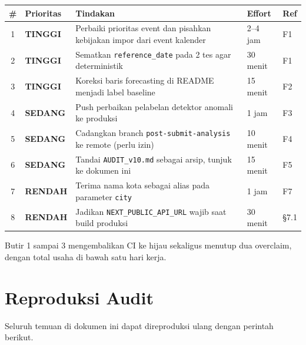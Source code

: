 \documentclass[11pt,a4paper]{article}
\newcommand{\code}[1]{\texttt{\small #1}}
\newcommand{\sevH}{\textcolor{sevhigh}{\textbf{TINGGI}}}
\newcommand{\sevM}{\textcolor{sevmed}{\textbf{SEDANG}}}
\newcommand{\sevL}{\textcolor{sevlow}{\textbf{RENDAH}}}
\begin{document}
\begin{center}
\begin{tabular}{@{}clp{7.4cm}ll@{}}
\toprule
\textbf{\#} & \textbf{Prioritas} & \textbf{Tindakan} & \textbf{Effort} & \textbf{Ref} \\
\midrule
1 & \sevH & Perbaiki prioritas event dan pisahkan kebijakan impor dari event kalender & 2--4 jam & F1 \\
2 & \sevH & Sematkan \code{reference\_date} pada 2 tes agar deterministik & 30 menit & F1 \\
3 & \sevH & Koreksi baris forecasting di README menjadi label baseline & 15 menit & F2 \\
4 & \sevM & Push perbaikan pelabelan detektor anomali ke produksi & 1 jam & F3 \\
5 & \sevM & Cadangkan branch \code{post-submit-analysis} ke remote (perlu izin) & 10 menit & F4 \\
6 & \sevM & Tandai \code{AUDIT\_v10.md} sebagai arsip, tunjuk ke dokumen ini & 15 menit & F5 \\
7 & \sevL & Terima nama kota sebagai alias pada parameter \code{city} & 1 jam & F7 \\
8 & \sevL & Jadikan \code{NEXT\_PUBLIC\_API\_URL} wajib saat build produksi & 30 menit & \S7.1 \\
\bottomrule
\end{tabular}
\end{center}

\noindent
Butir 1 sampai 3 mengembalikan CI ke hijau sekaligus menutup dua overclaim, dengan total usaha di
bawah satu hari kerja.

\section{Reproduksi Audit}

Seluruh temuan di dokumen ini dapat direproduksi ulang dengan perintah berikut.
\end{document}
